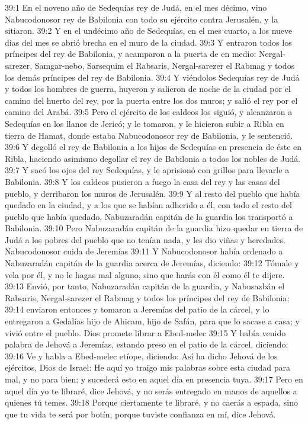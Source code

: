 39:1 En el noveno año de Sedequías rey de Judá, en el mes décimo, vino Nabucodonosor rey de Babilonia con todo su ejército contra Jerusalén, y la sitiaron. 
39:2 Y en el undécimo año de Sedequías, en el mes cuarto, a los nueve días del mes se abrió brecha en el muro de la ciudad. 
39:3 Y entraron todos los príncipes del rey de Babilonia, y acamparon a la puerta de en medio: Nergal-sarezer, Samgar-nebo, Sarsequim el Rabsaris, Nergal-sarezer el Rabmag y todos los demás príncipes del rey de Babilonia. 
39:4 Y viéndolos Sedequías rey de Judá y todos los hombres de guerra, huyeron y salieron de noche de la ciudad por el camino del huerto del rey, por la puerta entre los dos muros; y salió el rey por el camino del Arabá. 
39:5 Pero el ejército de los caldeos los siguió, y alcanzaron a Sedequías en los llanos de Jericó; y le tomaron, y le hicieron subir a Ribla en tierra de Hamat, donde estaba Nabucodonosor rey de Babilonia, y le sentenció. 
39:6 Y degolló el rey de Babilonia a los hijos de Sedequías en presencia de éste en Ribla, haciendo asimismo degollar el rey de Babilonia a todos los nobles de Judá. 
39:7 Y sacó los ojos del rey Sedequías, y le aprisionó con grillos para llevarle a Babilonia. 
39:8 Y los caldeos pusieron a fuego la casa del rey y las casas del pueblo, y derribaron los muros de Jerusalén. 
39:9 Y al resto del pueblo que había quedado en la ciudad, y a los que se habían adherido a él, con todo el resto del pueblo que había quedado, Nabuzaradán capitán de la guardia los transportó a Babilonia. 
39:10 Pero Nabuzaradán capitán de la guardia hizo quedar en tierra de Judá a los pobres del pueblo que no tenían nada, y les dio viñas y heredades. 
Nabucodonosor cuida de Jeremías 
39:11 Y Nabucodonosor había ordenado a Nabuzaradán capitán de la guardia acerca de Jeremías, diciendo: 
39:12 Tómale y vela por él, y no le hagas mal alguno, sino que harás con él como él te dijere. 
39:13 Envió, por tanto, Nabuzaradán capitán de la guardia, y Nabusazbán el Rabsaris, Nergal-sarezer el Rabmag y todos los príncipes del rey de Babilonia; 
39:14 enviaron entonces y tomaron a Jeremías del patio de la cárcel, y lo entregaron a Gedalías hijo de Ahicam, hijo de Safán, para que lo sacase a casa; y vivió entre el pueblo. 
Dios promete librar a Ebed-melec 
39:15 Y había venido palabra de Jehová a Jeremías, estando preso en el patio de la cárcel, diciendo; 
39:16 Ve y habla a Ebed-melec etíope, diciendo: Así ha dicho Jehová de los ejércitos, Dios de Israel: He aquí yo traigo mis palabras sobre esta ciudad para mal, y no para bien; y sucederá esto en aquel día en presencia tuya. 
39:17 Pero en aquel día yo te libraré, dice Jehová, y no serás entregado en manos de aquellos a quienes tú temes. 
39:18 Porque ciertamente te libraré, y no caerás a espada, sino que tu vida te será por botín, porque tuviste confianza en mí, dice Jehová. 
